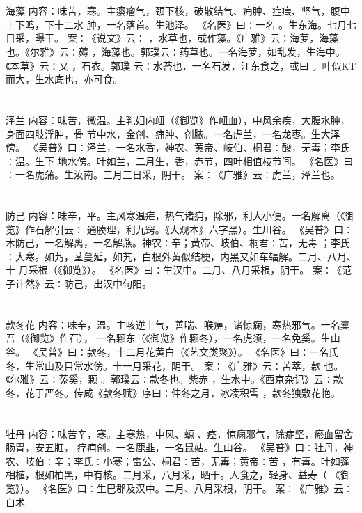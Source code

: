 \documentclass[12pt,UTF8]{ctexbook}
\begin{document}
\section{}海藻
内容：味苦，寒。主瘿瘤气，颈下核，破散结气、痈肿、症瘕、坚气，腹中上下鸣，下十二水 
肿，一名落首。生池泽。 
《名医》曰∶一名 。生东海。七月七日采，曝干。 
案∶《说文》云∶ ，水草也，或作藻。《广雅》云∶海萝，海藻也。《尔雅》云∶薅 
，海藻也。郭璞云∶药草也。一名海萝，如乱发，生海中。《本草》云∶又 ，石衣。郭璞 
云∶水苔也，一名石发，江东食之，或曰 。叶似KT 而大，生水底也，亦可食。 


\section{}泽兰
内容：味苦，微温。主乳妇内衄（《御览》作衄血），中风余疾，大腹水肿，身面四肢浮肿，骨 
节中水，金创、痈肿、创脓。一名虎兰，一名龙枣。生大泽傍。 
《吴普》曰∶泽兰，一名水香，神农、黄帝、岐伯、桐君∶酸，无毒；李氏∶温。生下 
地水傍。叶如兰，二月生，香，赤节，四叶相值枝节间。 
《名医》曰∶一名虎蒲。生汝南。三月三日采，阴干。 
案∶《广雅》云∶虎兰，泽兰也。 


\section{}防己
内容：味辛，平。主风寒温疟，热气诸痈，除邪，利大小便。一名解离（《御览》作石解引云∶ 
通腠理，利九窍。《大观本》六字黑）。生川谷。 
《吴普》曰∶木防己，一名解离，一名解燕。神农∶辛；黄帝、岐伯、桐君∶苦，无毒 
；李氏∶大寒。如艿，茎蔓延，如艽，白根外黄似结梗，内黑又如车辐解。二月、八月、十 
月采根（《御览》）。 
《名医》曰∶生汉中。二月、八月采根，阴干。 
案∶《范子计然》云∶防己，出汉中旬阳。 


\section{}款冬花
内容：味辛，温。主咳逆上气，善喘、喉痹，诸惊痫，寒热邪气。一名橐吾（《御览》作石）， 
一名颗东（《御览》作颗冬），一名虎须，一名免奚。生山谷。 
《吴普》曰∶款冬，十二月花黄白（《艺文类聚》）。 
《名医》曰∶一名氏冬，生常山及目常水傍。十一月采花，阴干。 
案∶《广雅》云∶苦萃，款 也。《尔雅》云∶菟奚，颗 。郭璞云∶款冬也。紫赤 
，生水中。《西京杂记》云∶款冬，花于严冬。传咸《款冬赋》序曰∶仲冬之月，冰凌积雪 
，款冬独敷花艳。 


\section{}牡丹
内容：味苦辛，寒。主寒热，中风、螈 、痉，惊痫邪气，除症坚，瘀血留舍肠胃，安五脏， 
疗痈创。一名鹿韭，一名鼠姑。生山谷。 
《吴普》曰∶牡丹，神农、岐伯∶辛；李氏∶小寒；雷公、桐君∶苦，无毒；黄帝∶苦 
，有毒。叶如蓬相植，根如柏黑，中有核。二月采，八月采，晒干。人食之，轻身、益寿（ 
《御览》）。 
《名医》曰∶生巴郡及汉中。二月、八月采根，阴干。 
案∶《广雅》云∶白术 
\end{document}
